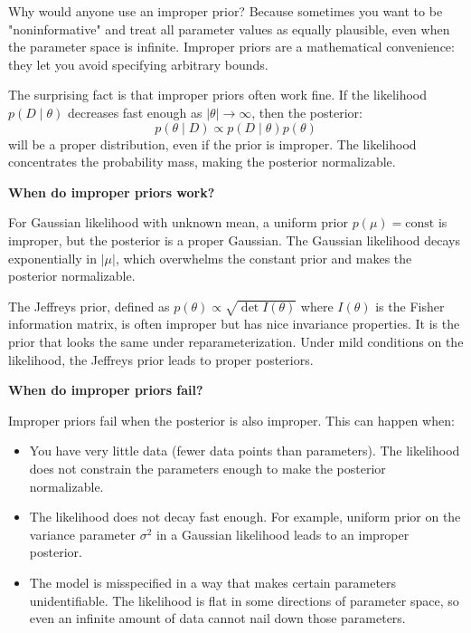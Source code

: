 Why would anyone use an improper prior? Because sometimes you want to be "noninformative" and treat all parameter values as equally plausible, even when the parameter space is infinite. Improper priors are a mathematical convenience: they let you avoid specifying arbitrary bounds.

The surprising fact is that improper priors often work fine. If the likelihood $p(D \mid \theta)$ decreases fast enough as $|\theta| \to \infty$, then the posterior:
\begin{equation}
p(\theta \mid D) \propto p(D \mid \theta) p(\theta)
\end{equation}
will be a proper distribution, even if the prior is improper. The likelihood concentrates the probability mass, making the posterior normalizable.

\textbf{When do improper priors work?}

For Gaussian likelihood with unknown mean, a uniform prior $p(\mu) = \text{const}$ is improper, but the posterior is a proper Gaussian. The Gaussian likelihood decays exponentially in $|\mu|$, which overwhelms the constant prior and makes the posterior normalizable.

The Jeffreys prior, defined as $p(\theta) \propto \sqrt{\det I(\theta)}$ where $I(\theta)$ is the Fisher information matrix, is often improper but has nice invariance properties. It is the prior that looks the same under reparameterization. Under mild conditions on the likelihood, the Jeffreys prior leads to proper posteriors.

\textbf{When do improper priors fail?}

Improper priors fail when the posterior is also improper. This can happen when:

\begin{itemize}
\item You have very little data (fewer data points than parameters). The likelihood does not constrain the parameters enough to make the posterior normalizable.

\item The likelihood does not decay fast enough. For example, uniform prior on the variance parameter $\sigma^2$ in a Gaussian likelihood leads to an improper posterior.

\item The model is misspecified in a way that makes certain parameters unidentifiable. The likelihood is flat in some directions of parameter space, so even an infinite amount of data cannot nail down those parameters.
\end{itemize}

